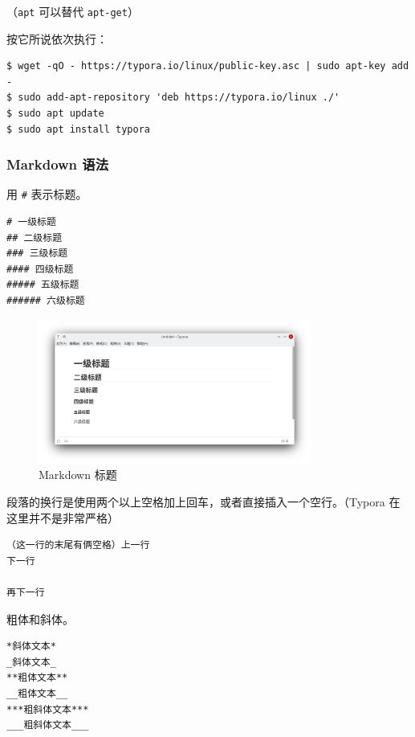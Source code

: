 \documentclass[UTF-8]{ctexart}
\begin{document}
				（\texttt{apt} 可以替代 \texttt{apt-get}）
			
				按它所说依次执行：
				
				\begin{verbatim}
$ wget -qO - https://typora.io/linux/public-key.asc | sudo apt-key add -
$ sudo add-apt-repository 'deb https://typora.io/linux ./'
$ sudo apt update
$ sudo apt install typora
				\end{verbatim}
			
			\subsubsection{Markdown 语法}
			
				用 \texttt{\#} 表示标题。
			
				\begin{verbatim}
# 一级标题
## 二级标题
### 三级标题
#### 四级标题
##### 五级标题
###### 六级标题
				\end{verbatim}
			
				\begin{figure}[H]
					\centering
					\includegraphics[width=0.8\textwidth]{fig/markdown_title.png}
					\caption*{Markdown 标题}
				\end{figure}
				
				段落的换行是使用两个以上空格加上回车，或者直接插入一个空行。（Typora 在这里并不是非常严格）
				
				\begin{verbatim}
（这一行的末尾有俩空格）上一行  
下一行

再下一行
				\end{verbatim}
			
				粗体和斜体。
			
				\begin{verbatim}
*斜体文本*
_斜体文本_
**粗体文本**
__粗体文本__
***粗斜体文本***
___粗斜体文本___
				\end{verbatim}
			
\end{document}
